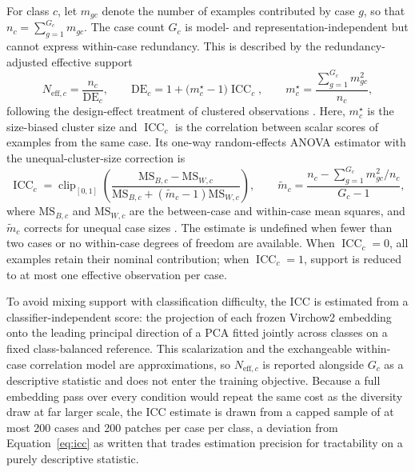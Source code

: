 \documentclass[11pt]{article}
\begin{document}
For class $c$, let $m_{gc}$ denote the number of examples contributed by case $g$, so that $n_c=\sum_{g=1}^{G_c}m_{gc}$. The case count $G_c$ is model- and representation-independent but cannot express within-case redundancy. This is described by the redundancy-adjusted effective support
\begin{equation}
  N_{\mathrm{eff},c}=\frac{n_c}{\mathrm{DE}_c},
  \qquad
  \mathrm{DE}_c=1+\bigl(m^{\star}_c-1\bigr)\operatorname{ICC}_c,
  \qquad
  m^{\star}_c=\frac{\sum_{g=1}^{G_c}m_{gc}^{2}}{n_c},
  \label{eq:neff}
\end{equation}
\noindent following the design-effect treatment of clustered observations \citep{kish1965survey,rutterford2015methods}. Here, $m^{\star}_c$ is the size-biased cluster size and $\operatorname{ICC}_c$ is the correlation between scalar scores of examples from the same case. Its one-way random-effects ANOVA estimator with the unequal-cluster-size correction is
\begin{equation}
  \operatorname{ICC}_c=
  \operatorname{clip}_{[0,1]}\!\left(
    \frac{\mathrm{MS}_{B,c}-\mathrm{MS}_{W,c}}
         {\mathrm{MS}_{B,c}+(\widetilde m_c-1)\mathrm{MS}_{W,c}}
  \right),
  \qquad
  \widetilde m_c=
  \frac{n_c-\sum_{g=1}^{G_c}m_{gc}^{2}/n_c}{G_c-1},
  \label{eq:icc}
\end{equation}
\noindent where $\mathrm{MS}_{B,c}$ and $\mathrm{MS}_{W,c}$ are the between-case and within-case mean squares, and $\widetilde m_c$ corrects for unequal case sizes \citep{kenny1985separating}. The estimate is undefined when fewer than two cases or no within-case degrees of freedom are available. When $\operatorname{ICC}_c=0$, all examples retain their nominal contribution; when $\operatorname{ICC}_c=1$, support is reduced to at most one effective observation per case.

To avoid mixing support with classification difficulty, the ICC is estimated from a classifier-independent score: the projection of each frozen Virchow2 embedding onto the leading principal direction of a PCA fitted jointly across classes on a fixed class-balanced reference. This scalarization and the exchangeable within-case correlation model are approximations, so $N_{\mathrm{eff},c}$ is reported alongside $G_c$ as a descriptive statistic and does not enter the training objective. Because a full embedding pass over every condition would repeat the same cost as the diversity draw at far larger scale, the ICC estimate is drawn from a capped sample of at most 200 cases and 200 patches per case per class, a deviation from Equation~\eqref{eq:icc} as written that trades estimation precision for tractability on a purely descriptive statistic.
\end{document}
